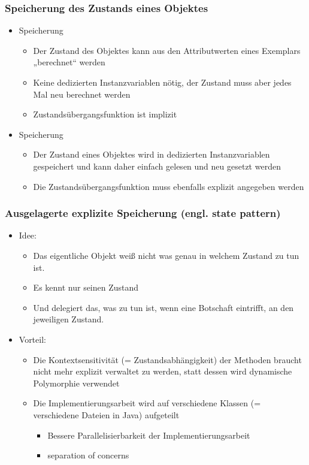 \subsubsection{Speicherung des Zustands eines Objektes}
\begin{itemize}
    \item {} Speicherung
    \begin{itemize}
        \item Der Zustand des Objektes kann aus den Attributwerten eines Exemplars „berechnet“ werden
        \item Keine dedizierten Instanzvariablen nötig, der Zustand muss aber jedes Mal neu berechnet werden
        \item Zustandsübergangsfunktion ist implizit
    \end{itemize}
    \item {} Speicherung
    \begin{itemize}
        \item Der Zustand eines Objektes wird in dedizierten Instanzvariablen gespeichert und kann daher einfach gelesen und neu gesetzt werden
        \item Die Zustandsübergangsfunktion muss ebenfalls explizit angegeben werden
    \end{itemize}
\end{itemize}

\subsubsection{Ausgelagerte explizite Speicherung (engl. state pattern)}
\begin{itemize}
    \item Idee:
    \begin{itemize}
        \item Das eigentliche Objekt weiß nicht was genau in welchem Zustand zu tun ist.
        \item Es kennt nur seinen Zustand
        \item Und delegiert das, was zu tun ist, wenn eine Botschaft eintrifft, an den jeweiligen Zustand.
    \end{itemize}
    \item Vorteil:
    \begin{itemize}
        \item Die Kontextsensitivität (= Zustandsabhängigkeit) der Methoden braucht nicht mehr explizit verwaltet zu werden, statt dessen wird dynamische Polymorphie verwendet
        \item Die Implementierungsarbeit wird auf verschiedene Klassen (= verschiedene Dateien in Java) aufgeteilt
        \begin{itemize}
            \item Bessere Parallelisierbarkeit der Implementierungsarbeit
            \item \glqq separation of concerns\grqq
        \end{itemize}
    \end{itemize}
\end{itemize}